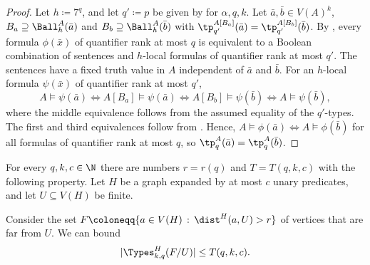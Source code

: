 \lemLocalToGlobal*

\begin{proof}
Let $h\coloneqq 7^q$, and let $q'\coloneqq p$ be given by  for $\alpha,q,k$.
Let $\bar a,\bar b\in V(A)^k$, $B_a\supseteq \Ball_h^A(\bar a)$ and $B_b\supseteq \Ball_h^A(\bar b)$ with $\tp_{q'}^{A[B_a]}(\bar a)=\tp_{q'}^{A[B_b]}(\bar b)$.
By , every formula $\phi(\bar x)$ of quantifier rank at most $q$ is equivalent to a Boolean combination of sentences and $h$-local formulas of quantifier rank at most $q'$.
The sentences have a fixed truth value in $A$ independent of $\bar a$ and $\bar b$.
For an $h$-local formula $\psi(\bar x)$ of quantifier rank at most $q'$,
\[
  A\models\psi(\bar a)
  \iff
  A[B_a]\models\psi(\bar a)
  \iff
  A[B_b]\models\psi(\bar b)
  \iff
  A\models\psi(\bar b),
\]
where the middle equivalence follows from the assumed equality of the $q'$-types.
The first and third equivalences follow from .
Hence, $A\models\phi(\bar a)\iff A\models\phi(\bar b)$ for all formulas of quantifier rank at most $q$, so $\tp_q^A(\bar a)=\tp_q^A(\bar b)$.
\end{proof}

\begin{lemma}\label{lem:sep-types}
    For every $q,k,c\in\N$ there are numbers $r=r(q)$ and $T=T(q,k,c)$ with the following property. Let $H$ be a graph expanded by at most $c$ unary predicates, and let $U\subseteq V(H)$ be finite.

    Consider the set $F \coloneqq \{a\in V(H) \,:\, \dist^H(a,U) > r\}$ of vertices that are far from $U$. We can bound
    \[
      |\Types^H_{k,q}(F/U)|\leq T(q,k,c).
    \]
\end{lemma}

